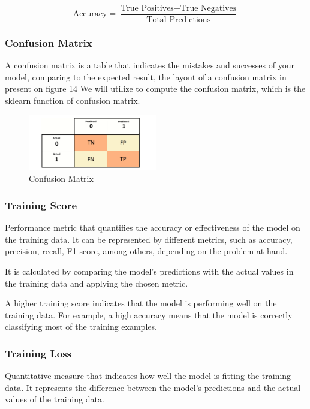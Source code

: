 \documentclass[conference]{IEEEtran}
\begin{document}
\[ \text{Accuracy} = \frac{\text{True Positives} + \text{True Negatives}}{\text{Total Predictions}} \]

\subsubsection{Confusion Matrix}

A confusion matrix is a table that indicates the mistakes and successes of your model, comparing to the expected result, the layout of a confusion matrix in present on figure 14 We will utilize to compute the confusion matrix, which is the sklearn function of confusion matrix.

\begin{figure}[H]
\centering
    \includegraphics[width=0.5\textwidth]{images/ConfusionMatrix.png}
    \caption{Confusion Matrix}
\end{figure}

\subsubsection{Training Score}

Performance metric that quantifies the accuracy or effectiveness of the model on the training data. It can be represented by different metrics, such as accuracy, precision, recall, F1-score, among others, depending on the problem at hand.

It is calculated by comparing the model's predictions with the actual values in the training data and applying the chosen metric.

A higher training score indicates that the model is performing well on the training data. For example, a high accuracy means that the model is correctly classifying most of the training examples.

\subsubsection{Training Loss}

Quantitative measure that indicates how well the model is fitting the training data. It represents the difference between the model's predictions and the actual values of the training data.
\end{document}
